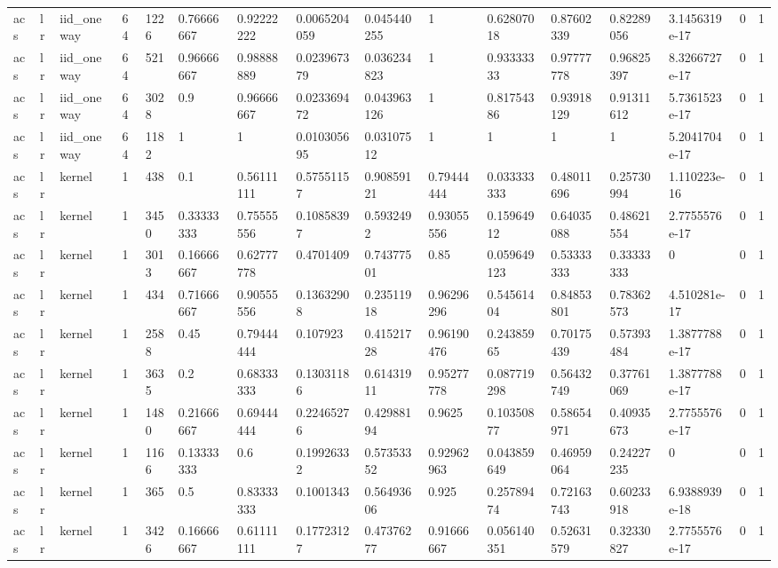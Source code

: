 \begin{tabular}{llllllllllllllll}
acs & lr & iid\_oneway & 64 & 1226 & 0.76666667 & 0.92222222 & 0.0065204059 & 0.045440255 & 1 & 0.62807018 & 0.87602339 & 0.82289056 & 3.1456319e-17 & 0 & 1 \\
acs & lr & iid\_oneway & 64 & 521 & 0.96666667 & 0.98888889 & 0.023967379 & 0.036234823 & 1 & 0.93333333 & 0.97777778 & 0.96825397 & 8.3266727e-17 & 0 & 1 \\
acs & lr & iid\_oneway & 64 & 3028 & 0.9 & 0.96666667 & 0.023369472 & 0.043963126 & 1 & 0.81754386 & 0.93918129 & 0.91311612 & 5.7361523e-17 & 0 & 1 \\
acs & lr & iid\_oneway & 64 & 1182 & 1 & 1 & 0.010305695 & 0.03107512 & 1 & 1 & 1 & 1 & 5.2041704e-17 & 0 & 1 \\
acs & lr & kernel & 1 & 438 & 0.1 & 0.56111111 & 0.57551157 & 0.90859121 & 0.79444444 & 0.033333333 & 0.48011696 & 0.25730994 & 1.110223e-16 & 0 & 1 \\
acs & lr & kernel & 1 & 3450 & 0.33333333 & 0.75555556 & 0.10858397 & 0.5932492 & 0.93055556 & 0.15964912 & 0.64035088 & 0.48621554 & 2.7755576e-17 & 0 & 1 \\
acs & lr & kernel & 1 & 3013 & 0.16666667 & 0.62777778 & 0.4701409 & 0.74377501 & 0.85 & 0.059649123 & 0.53333333 & 0.33333333 & 0 & 0 & 1 \\
acs & lr & kernel & 1 & 434 & 0.71666667 & 0.90555556 & 0.13632908 & 0.23511918 & 0.96296296 & 0.54561404 & 0.84853801 & 0.78362573 & 4.510281e-17 & 0 & 1 \\
acs & lr & kernel & 1 & 2588 & 0.45 & 0.79444444 & 0.107923 & 0.41521728 & 0.96190476 & 0.24385965 & 0.70175439 & 0.57393484 & 1.3877788e-17 & 0 & 1 \\
acs & lr & kernel & 1 & 3635 & 0.2 & 0.68333333 & 0.13031186 & 0.61431911 & 0.95277778 & 0.087719298 & 0.56432749 & 0.37761069 & 1.3877788e-17 & 0 & 1 \\
acs & lr & kernel & 1 & 1480 & 0.21666667 & 0.69444444 & 0.22465276 & 0.42988194 & 0.9625 & 0.10350877 & 0.58654971 & 0.40935673 & 2.7755576e-17 & 0 & 1 \\
acs & lr & kernel & 1 & 1166 & 0.13333333 & 0.6 & 0.19926332 & 0.57353352 & 0.92962963 & 0.043859649 & 0.46959064 & 0.24227235 & 0 & 0 & 1 \\
acs & lr & kernel & 1 & 365 & 0.5 & 0.83333333 & 0.1001343 & 0.56493606 & 0.925 & 0.25789474 & 0.72163743 & 0.60233918 & 6.9388939e-18 & 0 & 1 \\
acs & lr & kernel & 1 & 3426 & 0.16666667 & 0.61111111 & 0.17723127 & 0.47376277 & 0.91666667 & 0.056140351 & 0.52631579 & 0.32330827 & 2.7755576e-17 & 0 & 1 \\

\end{tabular}
